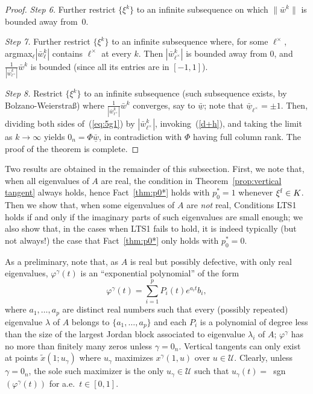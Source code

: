 \documentclass[letterpaper,10pt,conference]{ieeeconf}
\begin{document}
\begin{proof}
\smallskip\noindent
{\em Step 6.}
Further restrict $\{\xi^k\}$ to an infinite subsequence 
on which $\|\bar w^k\|$ is bounded away from~0.

\smallskip\noindent
{\em Step 7.}
Further restrict $\{\xi^k\}$ to an infinite subsequence where, for some 
$\ell^\times$, argmax$_\ell|\bar w_\ell^k|$ contains $\ell^\times$ at
every $k$.  Then $|\bar w_{\ell^\times}^k|$ is bounded away from 0, and
$\frac{1}{|\bar w_{\ell^\times}^k|}\bar w^k$ is bounded (since all its
entries are in $[-1,1]$).

\smallskip\noindent
{\em Step 8.}
Restrict $\{\xi^k\}$ to an infinite subsequence (such subsequence
exists, by Bolzano-Weierstra\ss) where 
$\frac{1}{|\bar w_{\ell^\times}^k|}\bar w^k$ converges, say to 
$\underline{\bar w}$; note that $\underline{\bar w}_{\ell^\times}=\pm1$.
Then, dividing both sides of~(\ref{eq:5g1})
by $|\bar w_{\ell^\times}^k|$, invoking~(\ref{d+h}), and taking
the limit as $k\to\infty$ yields $0_n=\Phi\underline{\bar w}$, in contradiction
with $\Phi$ having full column rank.  The proof of the theorem is complete.
\end{proof}

\bigskip
Two results are obtained in the remainder of this subsection.  First, 
we note that, when all eigenvalues of $A$ are real,
the condition in Theorem~\ref{prop:vertical tangent} always holds,
hence Fact~\ref{thm:p0*} holds with $p_0^*=1$ whenever 
$\xi^{\rm f}\in K$.
Then we show that, when some eigenvalues of $A$ are {\em not} real,
Conditions LTS1 holds if and only if the imaginary parts of such 
eigenvalues are small enough; we also show that, in the cases when
LTS1 fails to hold, it is indeed typically (but not always!) the case 
that Fact~\ref{thm:p0*} only holds with $p_0^*=0$.

As a preliminary, 
note that, as $A$ is real but possibly defective, with only real eigenvalues,
$\varphi^\gamma(t)$ is an ``exponential polynomial'' of the form
\[
\varphi^\gamma(t)=\sum_{i=1}^p P_i(t)e^{a_i t}b_i,
\]
where $a_1,\ldots,a_p$ are distinct real numbers such that
every (possibly repeated) eigenvalue $\lambda$ of $A$ belongs 
to $\{a_1,\ldots,a_p\}$
and each $P_i$ is a polynomial of degree less than the size of the largest
Jordan block associated to eigenvalue $\lambda_i$ of $A$; 
$\varphi^\gamma$ has no more than finitely many zeros unless 
$\gamma=0_n$.  
Vertical tangents can only exist at points $\tilde x(1;u_\gamma)$
where $u_\gamma$ maximizes $x^\gamma(1,u)$  over $u\in\mathcal U$.
Clearly, unless $\gamma=0_n$, the sole such maximizer is the 
only $u_\gamma\in\mathcal U$ 
such that $u_\gamma(t)=$~sgn$(\varphi^\gamma(t))$ for a.e.~$t\in[0,1]$.
\end{document}
